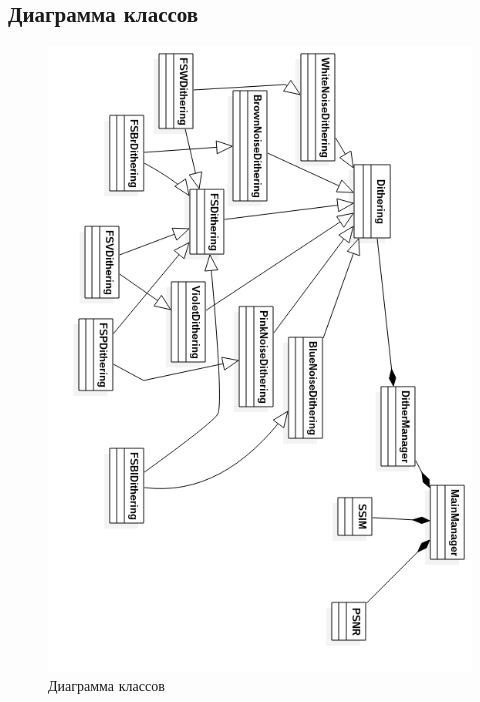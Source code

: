 \subsection{Диаграмма классов}
\begin{figure}[h!]
	\centering
	\includegraphics[width=\textwidth]{img/diagramm.png}
	\caption{Диаграмма классов}
	\label{fig:spire03}
\end{figure}

